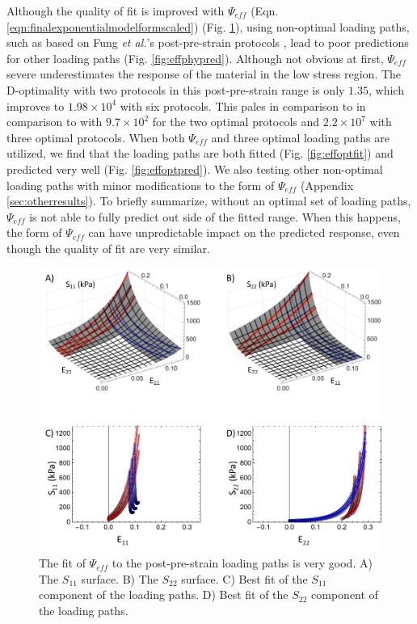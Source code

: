     
	Although the quality of fit is improved with $\Psi_{eff}$ (Eqn. \ref{eqn:finalexponentialmodelformscaled}) (Fig. \ref{fig:effphyfit}), using non-optimal loading paths, such as based on Fung \textit{et al.}'s post-pre-strain protocols \cite{fung_pseudoelasticity_1979}, lead to poor predictions for other loading paths (Fig. \ref{fig:effphypred}). Although not obvious at first, $\Psi_{eff}$ severe underestimates the response of the material in the low stress region. The D-optimality with two protocols in this post-pre-strain range is only $1.35$, which improves to $1.98\times 10^4$ with six protocols. This pales in comparison to in comparison to with $9.7 \times 10^2$ for the two optimal protocols and $2.2 \times 10^7$ with three optimal protocols. When both $\Psi_{eff}$ and three optimal loading paths are utilized, we find that the loading paths are both fitted (Fig. \ref{fig:effoptfit}) and predicted very well (Fig. \ref{fig:effoptpred}). We also testing other non-optimal loading paths with minor modifications to the form of $\Psi_{eff}$ (Appendix \ref{sec:otherresults}). To briefly summarize, without an optimal set of loading paths, $\Psi_{eff}$ is not able to fully predict out side of the fitted range. When this happens, the form of $\Psi_{eff}$ can have unpredictable impact on the predicted response, even though the quality of fit are very similar. 


\begin{figure}[hptb]
\centering
\includegraphics[width=6.5in]{Figures/effphyfit}
\caption{The fit of $\Psi_{eff}$ to the post-pre-strain loading paths is very good. A) The $S_{11}$ surface. B) The $S_{22}$ surface. C) Best fit of the $S_{11}$ component of the loading paths. D) Best fit of the $S_{22}$ component of the loading paths.}
\label{fig:effphyfit}
\end{figure} 


